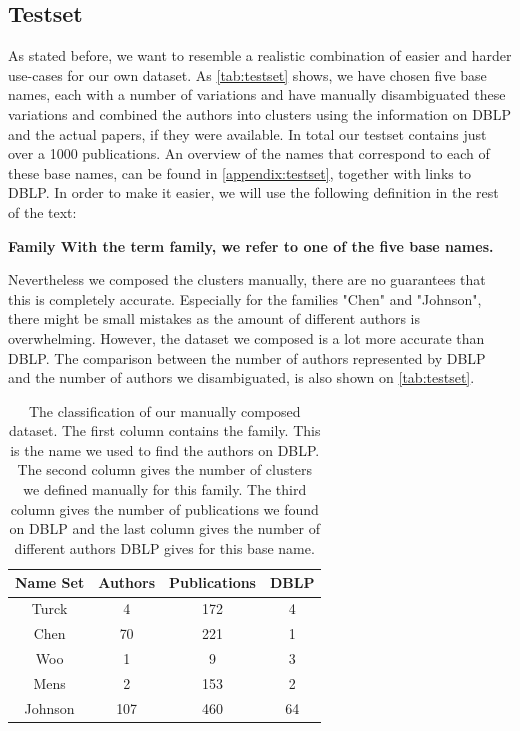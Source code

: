 \subsection{Testset}
\label{sec:testset}

As stated before, we want to resemble a realistic combination of easier and harder use-cases for our own dataset. As \autoref{tab:testset} shows, we have chosen five base names, each with a number of variations and have manually disambiguated these variations and combined the authors into clusters using the information on DBLP and the actual papers, if they were available. In total our testset contains just over a 1000 publications. An overview of the names that correspond to each of these base names, can be found in \ref{appendix:testset}, together with links to DBLP. In order to make it easier, we will use the following definition in the rest of the text:

\begin{mydef}
	\bfseries{Family} With the term family, we refer to one of the five base names.
\end{mydef}

Nevertheless we composed the clusters manually, there are no guarantees that this is completely accurate. Especially for the families "Chen" and "Johnson", there might be small mistakes as the amount of different authors is overwhelming. However, the dataset we composed is a lot more accurate than DBLP. The comparison between the number of authors represented by DBLP and the number of authors we disambiguated, is also shown on \autoref{tab:testset}.

\begin{table}
	\centering
		\begin{tabular}[ht]{|c|c|c|c|}
			\hline
			\bfseries{Name Set} & \bfseries{Authors} & \bfseries{Publications} & \bfseries{DBLP} \\
			\hline
			Turck & 4 & 172 & 4 \\
			\hline
			Chen & 70 & 221 & 1 \\
			\hline
			Woo & 1 & 9 & 3 \\
			\hline
			Mens & 2 & 153 & 2 \\
			\hline
			Johnson & 107 & 460 & 64 \\
			\hline
		\end{tabular}
	\caption{The classification of our manually composed dataset. The first column contains the family. This is the name we used to find the authors on DBLP. The second column gives the number of clusters we defined manually for this family. The third column gives the number of publications we found on DBLP and the last column gives the number of different authors DBLP gives for this base name.}
	\label{tab:testset}
\end{table}

